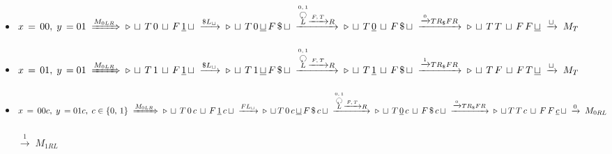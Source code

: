 \begin{itemize}
	\itemsep0em
	\item $x\,=\,00,\; y\,=01 \;\xRightarrow{M_{0LR}}\;
	\triangleright\, \sqcup\, T\, 0\, \sqcup\, F\, \underline{1}\, \sqcup\; \xrightarrow{\$L_\sqcup}\;
	\triangleright\, \sqcup\, T\, 0\, \underline{\sqcup}\, F\, \$\, \sqcup\;
	\xrightarrow{\overset{0,\,1}{\overset{\botcircleleft}{L}}\xrightarrow{F,\,T}R}\;
	\triangleright\, \sqcup\, T\, \underline{0}\, \sqcup\, F\, \$\, \sqcup\; \xrightarrow{\xrightarrow{0}TR_\$FR}\;
	\triangleright\, \sqcup\, T\, T\, \sqcup\, F\, F\, \underline{\sqcup}\;\xrightarrow{\sqcup}\; M_T
	\quad$ \textcolor{green}{}

	\item $x\,=\,01,\; y\,=01 \;\xRightarrow{M_{0LR}}\;
	\triangleright\, \sqcup\, T\, 1\, \sqcup\, F\, \underline{1}\, \sqcup\; \xrightarrow{\$L_\sqcup}\;
	\triangleright\, \sqcup\, T\, 1\, \underline{\sqcup}\, F\, \$\, \sqcup\;
	\xrightarrow{\overset{0,\,1}{\overset{\botcircleleft}{L}}\xrightarrow{F,\,T}R}\;
	\triangleright\, \sqcup\, T\, \underline{1}\, \sqcup\, F\, \$\, \sqcup\; \xrightarrow{\xrightarrow{1}TR_\$FR}\;
	\triangleright\, \sqcup\, T\, F\, \sqcup\, F\, T\, \underline{\sqcup}\;\xrightarrow{\sqcup}\; M_T
	\quad$ \textcolor{green}{}

	\item $x\,=\,00c,\; y\,=01c,\; c\in\{0,\,1\} \;\xRightarrow{M_{0LR}}\;
	\triangleright\, \sqcup\, T\, 0\, c\, \sqcup\, F\, \underline{1}\, c\, \sqcup\; \xrightarrow{FL_\sqcup}\;
	\\ \triangleright\, \sqcup\, T\, 0\, c\, \underline{\sqcup}\, F\, \$\, c\, \sqcup\;
	\xrightarrow{\overset{0,\,1}{\overset{\botcircleleft}{L}}\xrightarrow{F,\,T}R}\;
	\triangleright\, \sqcup\, T\, \underline{0}\, c\, \sqcup\, F\, \$\, c\, \sqcup\;
	\xrightarrow{\xrightarrow{0}TR_\$FR}\;\\
	\triangleright\, \sqcup\, T\, T\, c\, \sqcup\, F\, F\, \underline{c}\, \sqcup\; \xrightarrow{0}\; M_{0RL}
	\quad$ \textcolor{green}{}\\
	\makebox[3.7cm]{\hfill}$\xrightarrow{1}\; M_{1RL} \quad$ \textcolor{green}{}
\end{itemize}

